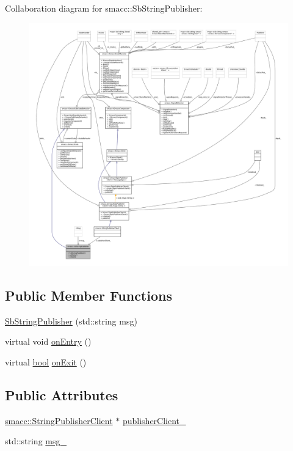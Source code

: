Collaboration diagram for smacc\+:\+:Sb\+String\+Publisher\+:
\nopagebreak
\begin{figure}[H]
\begin{center}
\leavevmode
\includegraphics[width=350pt]{classsmacc_1_1SbStringPublisher__coll__graph}
\end{center}
\end{figure}
\subsection*{Public Member Functions}
\begin{DoxyCompactItemize}
\item 
\hyperlink{classsmacc_1_1SbStringPublisher_ab01e3e417879f811c32dc47df5edb90f}{Sb\+String\+Publisher} (std\+::string msg)
\item 
virtual void \hyperlink{classsmacc_1_1SbStringPublisher_adde036f7d11370ec44ed418c2734b60a}{on\+Entry} ()
\item 
virtual \hyperlink{classbool}{bool} \hyperlink{classsmacc_1_1SbStringPublisher_a6e8de8b5d553092467ae980aa08ae576}{on\+Exit} ()
\end{DoxyCompactItemize}
\subsection*{Public Attributes}
\begin{DoxyCompactItemize}
\item 
\hyperlink{classsmacc_1_1StringPublisherClient}{smacc\+::\+String\+Publisher\+Client} $\ast$ \hyperlink{classsmacc_1_1SbStringPublisher_a85fd3ba65479542c9f5e02ffa727cf4c}{publisher\+Client\+\_\+}
\item 
std\+::string \hyperlink{classsmacc_1_1SbStringPublisher_ad3397fa2bb3097192c3f82d243704741}{msg\+\_\+}
\end{DoxyCompactItemize}


